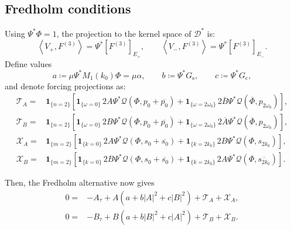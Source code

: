 \documentclass[11pt]{article}
\newcommand{\cQ}{\mathcal{Q}}
\newcommand{\cD}{\mathcal{D}}
\newcommand{\ip}[2]{\left\langle #1,#2\right\rangle}
\newcommand{\one}[1]{\bm{1}_{\{#1\}}}
\begin{document}
\subsection{Fredholm conditions}
Using $\Psi^*\Phi=1$, the projection to the kernel space of $\cD^*$ is:
\begin{equation}
 \ip{V_+}{F^{(3)}}=\Psi^*[F^{(3)}]_{E_+},
 \qquad
 \ip{V_-}{F^{(3)}}=\Psi^*[F^{(3)}]_{E_-}.
 \label{eq:projection-extracts-coefficient}
\end{equation}
Define values
\begin{equation}
 a\coloneqq\mu\Psi^*M_1(k_0)\Phi=\mu\alpha,
 \qquad b\coloneqq\Psi^*G_{\mathrm{s}},
 \qquad c\coloneqq\Psi^*G_{\mathrm{c}},
 \label{eq:abc}
\end{equation}
and denote forcing projections as:
\begin{align*}
\mathcal T_A={}&\one{n=2}\left[
 \one{\omega=0}\,2A\Psi^*\cQ(\Phi,p_0+\overline{p_0})
 +\one{\omega=2\omega_0}\,2\overline B
 \Psi^*\cQ(\overline\Phi,p_{2\omega_0})\right],\\
 \mathcal T_B={}&\one{n=2}\left[
 \one{\omega=0}\,2B\Psi^*\cQ(\Phi,p_0+\overline{p_0})
 +\one{\omega=2\omega_0}\,2\overline A
 \Psi^*\cQ(\overline\Phi,p_{2\omega_0})\right],\\
 \mathcal X_A={}&\one{m=2}\left[
 \one{k=0}\,2A\Psi^*\cQ(\Phi,s_0+\overline{s_0})
 +\one{k=2k_0}\,2B\Psi^*\cQ(\Phi,s_{2k_0})\right],\\
 \mathcal X_B={}&\one{m=2}\left[
 \one{k=0}\,2B\Psi^*\cQ(\Phi,s_0+\overline{s_0})
 +\one{k=2k_0}\,2A\Psi^*\cQ(\Phi,\overline{s_{2k_0}})\right].
\end{align*}

Then, the Fredholm alternative now gives
\begin{subequations}
\label{eq:full-solvability}
\begin{align}
 0={}&-A_\tau+A(a+b|A|^2+c|B|^2)+\mathcal T_A+\mathcal X_A,
 \label{eq:solvability-A}\\
 0={}&-B_\tau+B(a+b|B|^2+c|A|^2)+\mathcal T_B+\mathcal X_B.
 \label{eq:solvability-B}
\end{align}
\end{subequations}
\end{document}
